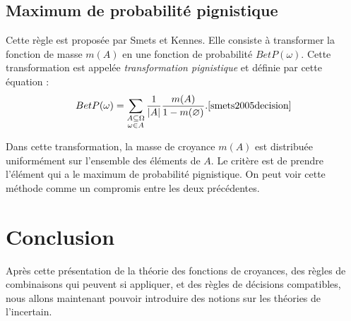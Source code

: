 \subsection{Maximum de probabilité pignistique}

Cette règle est proposée par Smets et Kennes. Elle consiste à transformer la fonction
de masse $m(A)$ en une fonction de probabilité $BetP(\omega)$. Cette transformation
est appelée \emph{transformation pignistique} et définie par cette équation :
\begin{equation}
BetP(\omega) = \sum_{\substack{A \subseteq \Omega \\
\omega \in A}} \frac{1}{|A|}  \frac{m(A)}{1-m(\varnothing)}. \cite{smets2005decision}
\end{equation}

Dans cette transformation, la masse de croyance $m(A)$ est distribuée uniformément
sur l’ensemble des éléments de $A$. Le critère est de prendre l'élément qui a le
maximum de probabilité pignistique. On peut voir cette méthode comme un compromis
entre les deux précédentes.

{}
\section*{Conclusion}

Après cette présentation de la théorie des fonctions de
croyances, des règles de combinaisons qui peuvent si appliquer,
et des règles de décisions compatibles, nous allons maintenant pouvoir introduire
des notions sur les théories de l'incertain.